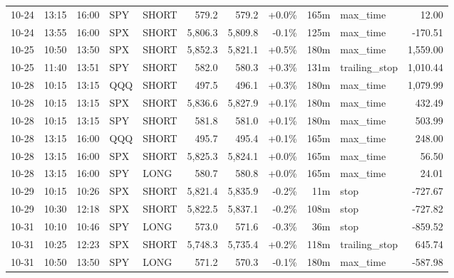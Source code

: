 \documentclass[11pt,a4paper,twoside]{article}
\begin{document}
\begin{center}
\begin{longtable}{>{\color{txtmain}}l l l l l r r r r >{\color{txtmain}}l r}
10-24 & 13:15 & 16:00 & SPY & SHORT & 579.2 & 579.2 & \textcolor{wingreen}{+0.0\%} & 165m & max\_time & \textcolor{wingreen}{12.00} \\
10-24 & 13:55 & 16:00 & SPX & SHORT & 5,806.3 & 5,809.8 & \textcolor{lossred}{-0.1\%} & 125m & max\_time & \textcolor{lossred}{-170.51} \\
10-25 & 10:50 & 13:50 & SPX & SHORT & 5,852.3 & 5,821.1 & \textcolor{wingreen}{+0.5\%} & 180m & max\_time & \textcolor{wingreen}{1,559.00} \\
10-25 & 11:40 & 13:51 & SPY & SHORT & 582.0 & 580.3 & \textcolor{wingreen}{+0.3\%} & 131m & trailing\_stop & \textcolor{wingreen}{1,010.44} \\
10-28 & 10:15 & 13:15 & QQQ & SHORT & 497.5 & 496.1 & \textcolor{wingreen}{+0.3\%} & 180m & max\_time & \textcolor{wingreen}{1,079.99} \\
10-28 & 10:15 & 13:15 & SPX & SHORT & 5,836.6 & 5,827.9 & \textcolor{wingreen}{+0.1\%} & 180m & max\_time & \textcolor{wingreen}{432.49} \\
10-28 & 10:15 & 13:15 & SPY & SHORT & 581.8 & 581.0 & \textcolor{wingreen}{+0.1\%} & 180m & max\_time & \textcolor{wingreen}{503.99} \\
10-28 & 13:15 & 16:00 & QQQ & SHORT & 495.7 & 495.4 & \textcolor{wingreen}{+0.1\%} & 165m & max\_time & \textcolor{wingreen}{248.00} \\
10-28 & 13:15 & 16:00 & SPX & SHORT & 5,825.3 & 5,824.1 & \textcolor{wingreen}{+0.0\%} & 165m & max\_time & \textcolor{wingreen}{56.50} \\
10-28 & 13:15 & 16:00 & SPY & LONG & 580.7 & 580.8 & \textcolor{wingreen}{+0.0\%} & 165m & max\_time & \textcolor{wingreen}{24.01} \\
10-29 & 10:15 & 10:26 & SPX & SHORT & 5,821.4 & 5,835.9 & \textcolor{lossred}{-0.2\%} & 11m & stop & \textcolor{lossred}{-727.67} \\
10-29 & 10:30 & 12:18 & SPX & SHORT & 5,822.5 & 5,837.1 & \textcolor{lossred}{-0.2\%} & 108m & stop & \textcolor{lossred}{-727.82} \\
10-31 & 10:10 & 10:46 & SPY & LONG & 573.0 & 571.6 & \textcolor{lossred}{-0.3\%} & 36m & stop & \textcolor{lossred}{-859.52} \\
10-31 & 10:25 & 12:23 & SPX & SHORT & 5,748.3 & 5,735.4 & \textcolor{wingreen}{+0.2\%} & 118m & trailing\_stop & \textcolor{wingreen}{645.74} \\
10-31 & 10:50 & 13:50 & SPY & LONG & 571.2 & 570.3 & \textcolor{lossred}{-0.1\%} & 180m & max\_time & \textcolor{lossred}{-587.98} \\

\end{longtable}
\end{center}
\end{document}

